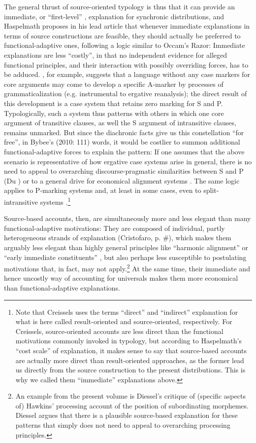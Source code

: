 \documentclass[output=paper]{langsci/langscibook}
\begin{document}
The general thrust of source-oriented typology is thus that it can provide an immediate, or “first-level” \citep[1]{Creissels2008}, explanation for synchronic distributions, and Haspelmath proposes in his lead article that whenever immediate explanations in terms of source constructions are feasible, they should actually be preferred to functional-adaptive ones, following a logic similar to Occam’s Razor: Immediate explanations are less “costly”, in that no independent evidence for alleged functional principles, and their interaction with possibly overriding forces, has to be adduced. \citet{Cristofaro2014}, for example, suggests that a language without any case markers for core arguments may come to develop a specific A-marker by processes of grammaticalization (e.g. instrumental to ergative reanalysis); the direct result of this development is a case system that retains zero marking for S and P. Typologically, such a system thus patterns with others in which one core argument of transitive clauses, as well the S argument of intransitive clauses, remains unmarked. But since the diachronic facts give us this constellation “for free”, in Bybee’s (2010: 111) words, it would be costlier to summon additional functional-adaptive forces to explain the pattern: If one assumes that the above scenario is representative of how ergative case systems arise in general, there is no need to appeal to overarching discourse-pragmatic similarities between S and P (Du \citealt{Bois1987}) or to a general drive for economical alignment systems \citep{Comrie1989}. The same logic applies to P-marking systems and, at least in some cases, even to split-intransitive systems \citep{Creissels2008}.\footnote{Note that Creissels uses the terms “direct” and “indirect” explanation for what is here called result-oriented and source-oriented, respectively. For Creissels, source-oriented accounts are less direct than the functional motivations commonly invoked in typology, but according to Haspelmath’s “cost scale” of explanation, it makes sense to say that source-based accounts are actually more direct than result-oriented approaches, as the former lead us directly from the source construction to the present distributions. This is why we called them “immediate” explanations above.} 

Source-based accounts, then, are simultaneously more and less elegant than many functional-adaptive motivations: They are composed of individual, partly heterogeneous strands of explanation (Cristofaro, p. \#), which makes them arguably less elegant than highly general principles like “harmonic alignment” \citep{Aissen2003} or “early immediate constituents” \citep{Hawkins1994}, but also perhaps less susceptible to postulating motivations that, in fact, may not apply.\footnote{An example from the present volume is Diessel’s critique of (specific aspects of) Hawkins’ processing account of the position of subordinating morphemes. Diessel argues that there is a plausible source-based explanation for these patterns that simply does not need to appeal to overarching processing principles.} At the same time, their immediate and hence uncostly way of accounting for universals makes them more economical than functional-adaptive explanations. 
\end{document}
